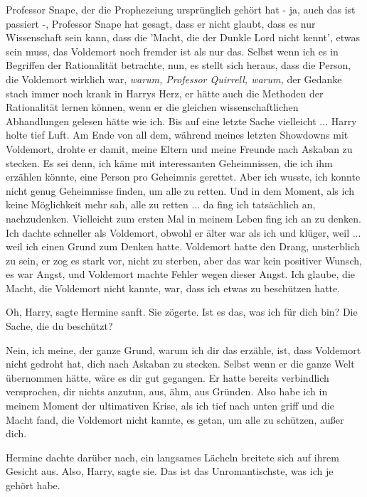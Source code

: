 \glqq{}Professor Snape, der die Prophezeiung ursprünglich gehört hat - ja, auch
das ist passiert -, Professor Snape hat gesagt, dass er nicht glaubt, dass es
nur Wissenschaft sein kann, dass die 'Macht, die der Dunkle Lord nicht kennt',
etwas sein muss, das Voldemort noch fremder ist als nur das. Selbst wenn ich es
in Begriffen der Rationalität betrachte, nun, es stellt sich heraus, dass die
Person, die Voldemort wirklich war\grqq{}, \emph{warum, Professor Quirrell,
warum,} der Gedanke stach immer noch krank in Harrys Herz, \glqq{}er hätte auch
die Methoden der Rationalität lernen können, wenn er die gleichen
wissenschaftlichen Abhandlungen gelesen hätte wie ich. Bis auf eine letzte Sache
vielleicht ...\grqq{} Harry holte tief Luft. \glqq{}Am Ende von all dem, während meines
letzten Showdowns mit Voldemort, drohte er damit, meine Eltern und meine Freunde
nach Askaban zu stecken. Es sei denn, ich käme mit interessanten Geheimnissen,
die ich ihm erzählen könnte, eine Person pro Geheimnis gerettet. Aber ich
wusste, ich konnte nicht genug Geheimnisse finden, um alle zu retten. Und in dem
Moment, als ich keine Möglichkeit mehr sah, alle zu retten ... da fing ich
tatsächlich an, nachzudenken. Vielleicht zum ersten Mal in meinem Leben fing ich
an zu denken. Ich dachte schneller als Voldemort, obwohl er älter war als ich
und klüger, weil ... weil ich einen Grund zum Denken hatte. Voldemort hatte den
Drang, unsterblich zu sein, er zog es stark vor, nicht zu sterben, aber das war
kein positiver Wunsch, es war Angst, und Voldemort machte Fehler wegen dieser
Angst. Ich glaube, die Macht, die Voldemort nicht kannte, war, dass ich etwas zu
beschützen hatte.\grqq{}

\glqq{}Oh, Harry\grqq{}, sagte Hermine sanft. Sie zögerte. \glqq{}Ist es das, was
ich für dich bin? Die Sache, die du beschützt?\grqq{}

\glqq{}Nein, ich meine, der ganze Grund, warum ich dir das erzähle, ist, dass
Voldemort nicht gedroht hat, dich nach Askaban zu stecken. Selbst wenn er die
ganze Welt übernommen hätte, wäre es dir gut gegangen. Er hatte bereits
verbindlich versprochen, dir nichts anzutun, aus, ähm, aus Gründen. Also habe
ich in meinem Moment der ultimativen Krise, als ich tief nach unten griff und
die Macht fand, die Voldemort nicht kannte, es getan, um alle zu schützen, außer
dich.\grqq{}

Hermine dachte darüber nach, ein langsames Lächeln breitete sich auf ihrem
Gesicht aus. \glqq{}Also, Harry\grqq{}, sagte sie. \glqq{}Das ist das
Unromantischste, was ich je gehört habe.\grqq{}


